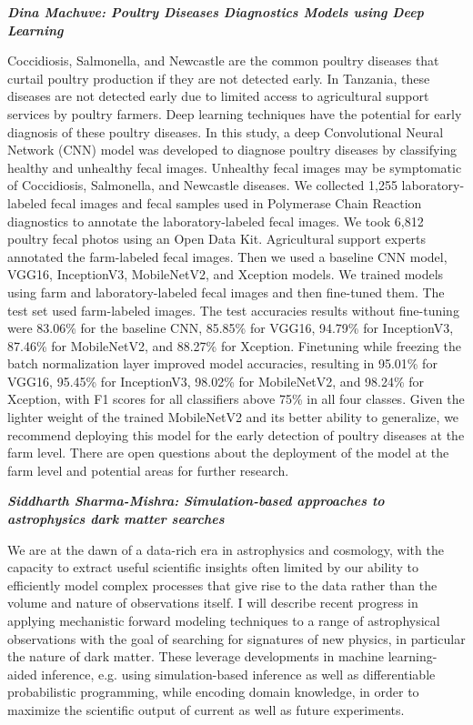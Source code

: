 \emph{\textbf{Dina Machuve: Poultry Diseases Diagnostics Models using
Deep Learning}}

Coccidiosis, Salmonella, and Newcastle are the common poultry diseases
that curtail poultry production if they are not detected early. In
Tanzania, these diseases are not detected early due to limited access to
agricultural support services by poultry farmers. Deep learning
techniques have the potential for early diagnosis of these poultry
diseases. In this study, a deep Convolutional Neural Network (CNN) model
was developed to diagnose poultry diseases by classifying healthy and
unhealthy fecal images. Unhealthy fecal images may be symptomatic of
Coccidiosis, Salmonella, and Newcastle diseases. We collected 1,255
laboratory-labeled fecal images and fecal samples used in Polymerase
Chain Reaction diagnostics to annotate the laboratory-labeled fecal
images. We took 6,812 poultry fecal photos using an Open Data Kit.
Agricultural support experts annotated the farm-labeled fecal images.
Then we used a baseline CNN model, VGG16, InceptionV3, MobileNetV2, and
Xception models. We trained models using farm and laboratory-labeled
fecal images and then fine-tuned them. The test set used farm-labeled
images. The test accuracies results without fine-tuning were 83.06\% for
the baseline CNN, 85.85\% for VGG16, 94.79\% for InceptionV3, 87.46\%
for MobileNetV2, and 88.27\% for Xception. Finetuning while freezing the
batch normalization layer improved model accuracies, resulting in
95.01\% for VGG16, 95.45\% for InceptionV3, 98.02\% for MobileNetV2, and
98.24\% for Xception, with F1 scores for all classifiers above 75\% in
all four classes. Given the lighter weight of the trained MobileNetV2
and its better ability to generalize, we recommend deploying this model
for the early detection of poultry diseases at the farm level. There are
open questions about the deployment of the model at the farm level and
potential areas for further research.

\emph{\textbf{Siddharth Sharma-Mishra: Simulation-based approaches to
astrophysics dark matter searches}}

We are at the dawn of a data-rich era in astrophysics and cosmology,
with the capacity to extract useful scientific insights often limited by
our ability to efficiently model complex processes that give rise to the
data rather than the volume and nature of observations itself. I will
describe recent progress in applying mechanistic forward modeling
techniques to a range of astrophysical observations with the goal of
searching for signatures of new physics, in particular the nature of
dark matter. These leverage developments in machine learning-aided
inference, e.g. using simulation-based inference as well as
differentiable probabilistic programming, while encoding domain
knowledge, in order to maximize the scientific output of current as well
as future experiments.

